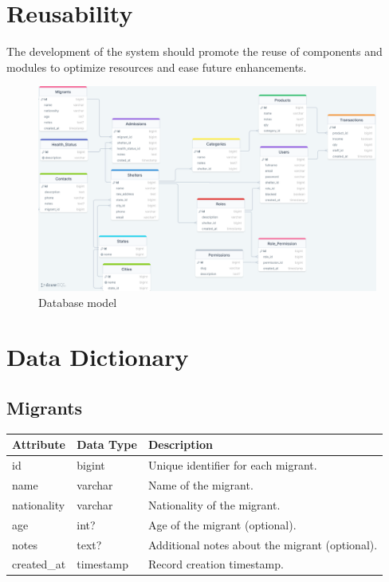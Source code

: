 \documentclass{scrreprt}
\begin{document}
\section*{Reusability}
The development of the system should promote the reuse of components and modules to optimize resources and ease future enhancements.

\begin{figure}[H]
    \centering
    \includegraphics[width=1.3\textwidth, angle=90]{database-diagram}
    \caption{Database model}
\end{figure}

\section*{Data Dictionary}

\subsection*{Migrants}
\begin{tabular}{|m{2.5cm}|m{2.5cm}|m{6cm}|}
\hline
\textbf{Attribute} & \textbf{Data Type} & \textbf{Description} \\
\hline
id & bigint & Unique identifier for each migrant. \\
\hline
name & varchar & Name of the migrant. \\
\hline
nationality & varchar & Nationality of the migrant. \\
\hline
age & int? & Age of the migrant (optional). \\
\hline
notes & text? & Additional notes about the migrant (optional). \\
\hline
created\_at & timestamp & Record creation timestamp. \\
\hline
\end{tabular}
\end{document}
